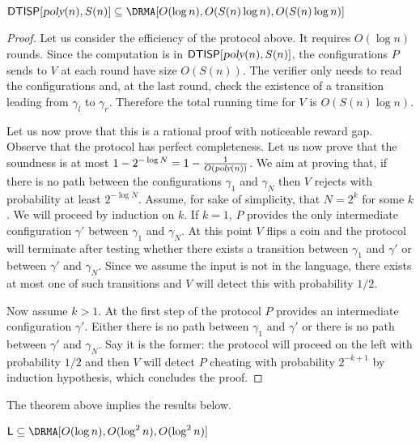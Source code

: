 \begin{theorem}
\label{thm:main}
$\DTISP[\poly(n), S(n)] \subseteq \DRMA[O(\log n), O(S(n)\log n), O(S(n)\log n)]$
\end{theorem}
\begin{proof}
Let us consider the efficiency of the protocol above.
It requires $O(\log n)$ rounds.
Since the computation is in ${\mathsf{DTISP}}[{\textsl{poly}}(n), S(n)]$, the configurations $P$ sends to $V$ at each round have size $O(S(n))$.
The verifier only needs to read the configurations and, at the last round, check the existence of a transition leading from $\gamma_l$ to $\gamma_r$. Therefore the total running time for $V$ is $O(S(n) \log n)$.

Let us now prove that this is a rational proof with noticeable reward gap.
Observe that the protocol has perfect completeness. 
Let us now prove that the soundness is at most $1 - 2^{-\log N} = 1 - \frac{1}{O({\textsl{poly}}(n))}$.
We aim at proving that, if there is no path between the configurations $\gamma_1$ and $\gamma_N$ then $V$ rejects with probability at least $2^{-\log N}$.
Assume, for sake of simplicity, that $N = 2^k$ for some $k$. We will proceed by induction on $k$. If $k=1$, $P$ provides the only intermediate configuration $\gamma'$ between $\gamma_1$ and $\gamma_N$. At this point $V$ flips a coin and the protocol will terminate after testing whether there exists a transition between $\gamma_1$ and $\gamma'$ or between $\gamma'$ and $\gamma_N$. Since we assume the input is not in the language, there exists at most one of such transitions and $V$ will detect this with probability $1/2$.

Now assume $k > 1$. At the first step of the protocol $P$ provides an intermediate configuration $\gamma'$. Either there is no path between $\gamma_1$ and $\gamma'$ or there is no path between $\gamma'$ and $\gamma_N$. Say it is the former: the protocol will proceed on the left with probability $1/2$ and then $V$ will detect $P$ cheating with probability $2^{-k+1}$ by induction hypothesis, which concludes the proof.

\end{proof}

\medskip
\noindent
The theorem above implies the results below. 
\begin{corollary}
	\label{cor:L-NL}
$ \L \subseteq \DRMA[O(\log n), O(\log^2 n ), O(\log^2 n )]$
\end{corollary}

